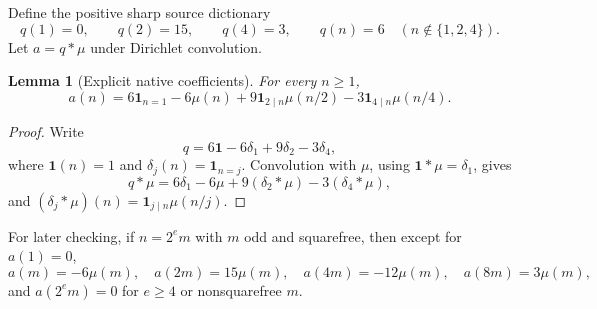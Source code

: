 \documentclass[11pt]{article}
\newtheorem{lemma}[theorem]{Lemma}
\newcommand{\1}{\mathbf 1}
\begin{document}
Define the positive sharp source dictionary
\begin{equation}\label{eq:qdict}
q(1)=0,\qquad q(2)=15,\qquad q(4)=3,\qquad
q(n)=6\quad(n\notin\{1,2,4\}).
\end{equation}
Let $a=q*\mu$ under Dirichlet convolution.

\begin{lemma}[Explicit native coefficients]\label{lem:aexplicit}
For every $n\ge1$,
\begin{equation}\label{eq:aexplicit}
 a(n)=6\1_{n=1}-6\mu(n)
 +9\1_{2\mid n}\mu(n/2)
 -3\1_{4\mid n}\mu(n/4).
\end{equation}
\end{lemma}
\begin{proof}
Write
\[
 q=6\mathbf 1-6\delta_1+9\delta_2-3\delta_4,
\]
where $\mathbf1(n)=1$ and $\delta_j(n)=\1_{n=j}$.  Convolution with $\mu$,
using $\mathbf1*\mu=\delta_1$, gives
\[
 q*\mu=6\delta_1-6\mu+9(\delta_2*\mu)-3(\delta_4*\mu),
\]
and $(\delta_j*\mu)(n)=\1_{j\mid n}\mu(n/j)$.
\end{proof}

For later checking, if $n=2^e m$ with $m$ odd and squarefree, then except for
$a(1)=0$,
\begin{equation}\label{eq:aclass}
 a(m)=-6\mu(m),\quad a(2m)=15\mu(m),\quad
 a(4m)=-12\mu(m),\quad a(8m)=3\mu(m),
\end{equation}
and $a(2^e m)=0$ for $e\ge4$ or nonsquarefree $m$.
\end{document}
